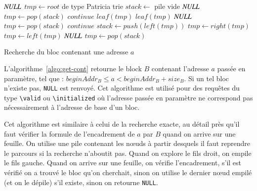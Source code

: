 \begin{algorithm}
\begin{algorithmic}
  \Return $\mathit{NULL}$
\Else
  \State $\mathit{tmp} \gets \mathit{root}$ de type Patricia trie
  \State $\mathit{stack} \gets$ pile vide
          \Return $\mathit{NULL}$
        \Else
          \State $\mathit{tmp} \gets \mathit{pop(stack)}$
          \State $\mathit{continue}$
        \EndIf
        \Return $\mathit{leaf(tmp)}$
        \Return $\mathit{leaf(tmp)}$
        \Return $\mathit{NULL}$
      \Else
        \State $\mathit{tmp} \gets \mathit{pop(stack)}$
        \State $\mathit{continue}$
      \EndIf
    \EndIf
      \State $\mathit{stack} \gets \mathit{push(left(tmp))}$
      \State $\mathit{tmp} \gets \mathit{right(tmp)}$
      \State $\mathit{tmp} \gets \mathit{left(tmp)}$
      \Return $\mathit{NULL}$
    \Else
      \State $\mathit{tmp} \gets \mathit{pop(stack)}$
    \EndIf
  \EndWhile
\EndIf
\end{algorithmic}
\caption{Recherche du bloc contenant une adresse $a$
  \label{algo:get-cont}}
\end{algorithm}

L'algorithme~\ref{algo:get-cont} retourne le block $B$ contenant
l'adresse $a$ passée en paramètre, tel que :
$beginAddr_B \le a < beginAddr_B + size_B$.
Si un tel bloc n'existe pas, \lstinline{NULL} est renvoyé.
Cet algorithme est utilisé pour des requêtes du type \lstinline{\valid} ou
\lstinline{\initialized} où l'adresse passée en paramètre ne correspond pas
nécessairement à l'adresse de base d'un bloc.

Cet algorithme est similaire à celui de la recherche exacte, au détail près
qu'il faut vérifier la formule de l'encadrement de $a$ par $B$ quand on arrive
sur une feuille.
On utilise une pile contenant les n\oe{}uds à partir desquels il faut reprendre
le parcours si la recherche n'aboutit pas.
Quand on explore le fils droit, on empile le fils gauche.
Quand on arrive sur une feuille, on vérifie l'encadrement, s'il est vérifié on
a trouvé le bloc qu'on cherchait, sinon on utilise le dernier n\oe{}ud empilé
(et on le dépile) s'il existe, sinon on retourne \lstinline{NULL}.


